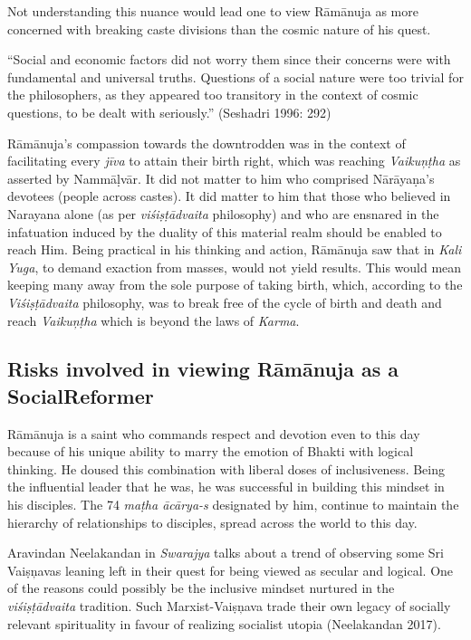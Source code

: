 Not understanding this nuance would lead one to view Rāmānuja as more concerned with breaking caste divisions than the cosmic nature of his quest.

\newpage

“Social and economic factors did not worry them since their concerns were with fundamental and universal truths. Questions of a social nature were too trivial for the philosophers, as they appeared too transitory in the context of cosmic questions, to be dealt with seriously.” (Seshadri 1996: 292)

Rāmānuja’s compassion towards the downtrodden was in the context of facilitating every \textit{jīva} to attain their birth right, which was reaching \textit{Vaikuņṭha} as asserted by Nammāḷvār. It did not matter to him who comprised Nārāyaṇa’s devotees (people across castes). It did matter to him that those who believed in Narayana alone (as per \textit{viśiṣṭādvaita} philosophy) and who are ensnared in the infatuation induced by the duality of this material realm should be enabled to reach Him. Being practical in his thinking and action, Rāmānuja saw that in \textit{Kali Yuga}, to demand exaction from masses, would not yield results. This would mean keeping many away from the sole purpose of taking birth, which, according to the \textit{Viśiṣṭādvaita} philosophy, was to break free of the cycle of birth and death and reach \textit{Vaikuņṭha }which is beyond the laws of \textit{Karma}.


\subsection*{Risks involved in viewing Rāmānuja as a Social\hfill \break Reformer}

Rāmānuja is a saint who commands respect and devotion even to this day because of his unique ability to marry the emotion of Bhakti with logical thinking. He doused this combination with liberal doses of inclusiveness. Being the influential leader that he was, he was successful in building this mindset in his disciples. The 74 \textit{maṭha ācārya-s} designated by him, continue to maintain the hierarchy of relationships to disciples, spread across the world to this day.

\vskip 4pt

Aravindan Neelakandan in \textit{Swarajya} talks about a trend of observing some Sri Vaiṣņavas leaning left in their quest for being viewed as secular and logical. One of the reasons could possibly be the inclusive mindset nurtured in the \textit{viśiṣṭādvaita} tradition. Such Marxist-Vaiṣņava trade their own legacy of socially relevant spirituality in favour of realizing socialist utopia (Neelakandan 2017).

